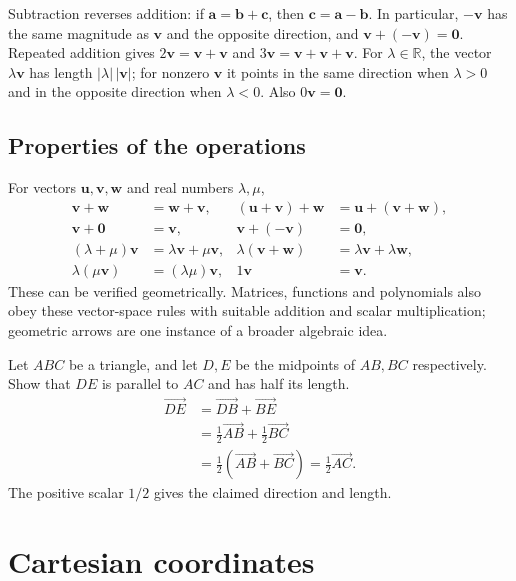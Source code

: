 Subtraction reverses addition: if $\mathbf a=\mathbf b+\mathbf c$, then
$\mathbf c=\mathbf a-\mathbf b$. In particular, $-\mathbf v$ has the same
magnitude as $\mathbf v$ and the opposite direction, and
$\mathbf v+(-\mathbf v)=\mathbf0$.
Repeated addition gives $2\mathbf v=\mathbf v+\mathbf v$ and
$3\mathbf v=\mathbf v+\mathbf v+\mathbf v$.
For $\lambda\in\mathbb R$, the vector $\lambda\mathbf v$ has length
$|\lambda|\,|\mathbf v|$; for nonzero $\mathbf v$ it points in the same
direction when $\lambda>0$ and in the opposite direction when $\lambda<0$.
Also $0\mathbf v=\mathbf0$.

\subsection{Properties of the operations}
For vectors $\mathbf u,\mathbf v,\mathbf w$ and real numbers $\lambda,\mu$,
\begin{align*}
 \mathbf v+\mathbf w&=\mathbf w+\mathbf v,
   & (\mathbf u+\mathbf v)+\mathbf w&=\mathbf u+(\mathbf v+\mathbf w),\\
 \mathbf v+\mathbf0&=\mathbf v,
   & \mathbf v+(-\mathbf v)&=\mathbf0,\\
 (\lambda+\mu)\mathbf v&=\lambda\mathbf v+\mu\mathbf v,
   & \lambda(\mathbf v+\mathbf w)&=\lambda\mathbf v+\lambda\mathbf w,\\
 \lambda(\mu\mathbf v)&=(\lambda\mu)\mathbf v,
   & 1\mathbf v&=\mathbf v.
\end{align*}
These can be verified geometrically. Matrices, functions and polynomials also
obey these vector-space rules with suitable addition and scalar multiplication;
geometric arrows are one instance of a broader algebraic idea.

\begin{example}
Let $ABC$ be a triangle, and let $D,E$ be the midpoints of $AB,BC$ respectively.
Show that $DE$ is parallel to $AC$ and has half its length.
\begin{align*}
 \overrightarrow{DE}
 &=\overrightarrow{DB}+\overrightarrow{BE}\\
 &=\frac12\overrightarrow{AB}+\frac12\overrightarrow{BC}\\
 &=\frac12(\overrightarrow{AB}+\overrightarrow{BC})
 =\frac12\overrightarrow{AC}.
\end{align*}
The positive scalar $1/2$ gives the claimed direction and length.
\end{example}

\section{Cartesian coordinates}

